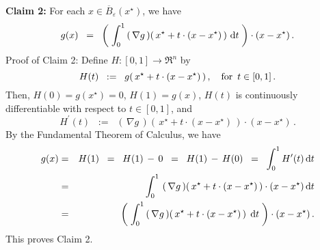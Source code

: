 \begin{enumerate}
	\vskip 0.3cm
	\noindent
	\textbf{Claim 2:}\quad
	For each $x \in \overline{B}_{\varepsilon}(x^{\star})$, we have
	\begin{equation*}
	g(x)
	\;\; = \;\;
		\left(\;
			\int_{0}^{1}
			\left(\,\nabla g\,\right)\!\left(\,x^{\star} + t\cdot(x-x^{\star})\,\right)
			\,\textnormal{d} t
		\;\right)
		\cdot
		(x - x^{\star})\,.
	\end{equation*}	
	Proof of Claim 2:\quad
	Define $H : [0,1] \longrightarrow \Re^{n}$ by
	\begin{equation*}
	H(t) \;\; := \;\; g\!\left(\,x^{\star} + t\cdot(x-x^{\star})\,\right),
	\quad
	\textnormal{for \,$t \in [0,1]$}\,.
	\end{equation*}
	Then, $H(0) = g(x^{\star}) = 0$, $H(1) = g(x)$,
	$H(t)$ is continuously differentiable with respect to $t \in [0,1]$, and
	\begin{equation*}
	H^{\prime}(t) \;\; := \;\; \left(\,\nabla g\,\right)\!\left(\,x^{\star} + t\cdot(x-x^{\star})\,\right) \cdot (x - x^{\star})\,.
	\end{equation*}
	By the Fundamental Theorem of Calculus, we have
	\begin{eqnarray*}
	g(x)
	& = &
		H(1) \;\; = \;\; H(1) \,-\, 0 \;\; = \;\; H(1) \,-\, H(0)
	\;\; = \;\;
		\int_{0}^{1} H^{\prime}(t) \,\textnormal{d} t
	\\
	& = &
		\int_{0}^{1}\,
			\left(\,\nabla g\,\right)\!\left(\,x^{\star} + t\cdot(x-x^{\star})\,\right) \cdot (x - x^{\star})
			\,\textnormal{d} t
	\\
	& = &
		\left(\;\int_{0}^{1}
			\left(\,\nabla g\,\right)\!\left(\,x^{\star} + t\cdot(x-x^{\star})\,\right) 
			\;\textnormal{d} t
			\;\right)
		\cdot (x - x^{\star})\,.
	\end{eqnarray*}
	This proves Claim 2.


\end{enumerate}
